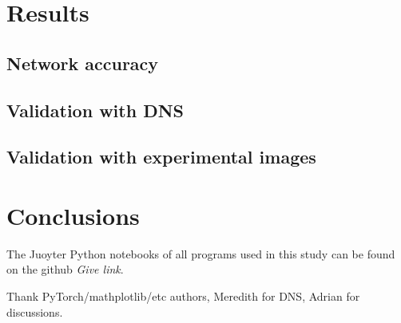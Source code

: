 \documentclass{svjour3}                     %
\begin{document}
\section{Results}

\subsection{Network accuracy}

\subsection{Validation with DNS}

\subsection{Validation with experimental images}

\section{Conclusions}

The Juoyter Python notebooks of all programs used in this study can be found on the github \textit{Give link}.

\begin{acknowledgements}
Thank PyTorch/mathplotlib/etc authors, Meredith for DNS, Adrian for discussions.
\end{acknowledgements}





\end{document}
